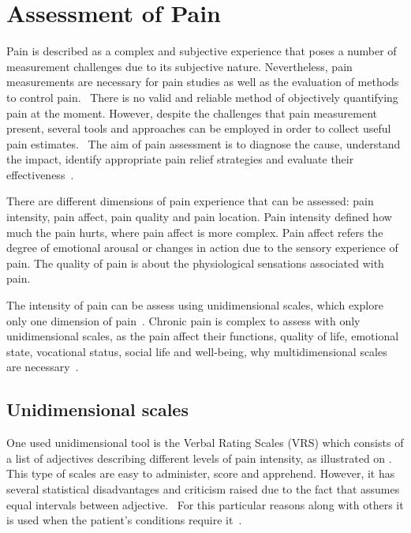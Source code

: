 \section{Assessment of Pain}
Pain is described as a complex and subjective experience that poses a number of measurement challenges due to its subjective nature. Nevertheless, pain measurements are necessary for pain studies as well as the evaluation of methods to control pain.~\cite{Jensen2001} There is no valid and reliable method of objectively quantifying pain at the moment. However, despite the challenges that pain measurement present, several tools and approaches can be employed in order to collect useful pain estimates.~\cite{Younger2010} The aim of pain assessment is to diagnose the cause, understand the impact, identify appropriate pain relief strategies and evaluate their effectiveness~\cite{Briggs2010}.

There are different dimensions of pain experience that can be assessed: pain intensity, pain affect, pain quality and pain location. Pain intensity defined how much the pain hurts, where pain affect is more complex. Pain affect refers the degree of emotional arousal or changes in action due to the sensory experience of pain. The quality of pain is about the physiological sensations associated with pain. 

The intensity of pain can be assess using unidimensional scales, which explore only one dimension of pain~\cite{Jensen2001}. %
Chronic pain is complex to assess with only unidimensional scales, as the pain affect their functions, quality of life, emotional state, vocational status, social life and well-being, why multidimensional scales are necessary~\cite{Ebert2010}. 


\subsection{Unidimensional scales}
One used unidimensional tool is the Verbal Rating Scales (VRS) which consists of a list of adjectives describing different levels of pain intensity, as illustrated on . This type of scales are easy to administer, score and apprehend. However, it has several statistical disadvantages and criticism raised due to the fact that assumes equal intervals between adjective.~\cite{Jensen2001} For this particular reasons along with others it is used when the patient's conditions require it~\cite{Jensen1986}. 

